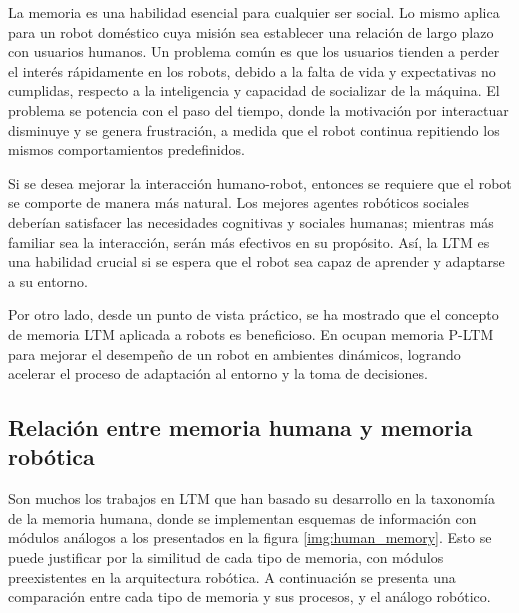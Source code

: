 La memoria es una habilidad esencial para cualquier ser social. Lo mismo aplica para un robot dom\'estico cuya misi\'on sea establecer una relaci\'on de largo plazo con usuarios humanos. Un problema com\'un es que los usuarios tienden a perder el inter\'es r\'apidamente en los robots, debido a la falta de vida y expectativas no cumplidas, respecto a la inteligencia y capacidad de socializar de la m\'aquina. El problema se potencia con el paso del tiempo, donde la motivaci\'on por interactuar disminuye y se genera frustraci\'on, a medida que el robot continua repitiendo los mismos comportamientos predefinidos\cite{Ho2009}.

Si se desea mejorar la interacci\'on humano-robot, entonces se requiere que el robot se comporte de manera m\'as natural. Los mejores agentes rob\'oticos sociales deber\'ian satisfacer las necesidades cognitivas y sociales humanas; mientras m\'as familiar sea la interacci\'on, ser\'an m\'as efectivos en su prop\'osito. As\'i, la LTM es una habilidad crucial si se espera que el robot sea capaz de aprender y adaptarse a su entorno.


Por otro lado, desde un punto de vista pr\'actico, se ha mostrado que el concepto de memoria LTM aplicada a robots es beneficioso. En \cite{Salgado2012} ocupan memoria P-LTM para mejorar el desempe\~no de un robot en ambientes din\'amicos, logrando acelerar el proceso de adaptaci\'on al entorno y la toma de decisiones.



%
%
%
%
%


\subsection{Relaci\'on entre memoria humana y memoria rob\'otica}


Son muchos los trabajos en LTM que han basado su desarrollo en la taxonom\'ia de la memoria humana, donde se implementan esquemas de informaci\'on con m\'odulos an\'alogos a los presentados en la figura \ref{img:human_memory}. Esto se puede justificar por la similitud de cada tipo de memoria, con m\'odulos preexistentes en la arquitectura rob\'otica. A continuaci\'on se presenta una comparaci\'on entre cada tipo de memoria y sus procesos, y el an\'alogo rob\'otico.

